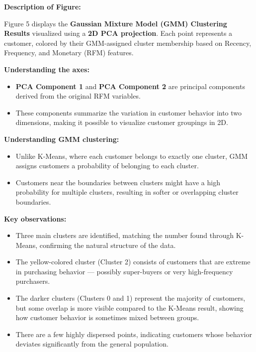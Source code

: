 \documentclass[12pt]{article}
\begin{document}
\noindent
\textbf{Description of Figure:} \\

\vspace{0.2cm}

Figure 5 displays the \textbf{Gaussian Mixture Model (GMM) Clustering Results} visualized using a \textbf{2D PCA projection}.  
Each point represents a customer, colored by their GMM-assigned cluster membership based on Recency, Frequency, and Monetary (RFM) features.

\vspace{0.4cm}

\textbf{Understanding the axes:}
\begin{itemize}
    \item \textbf{PCA Component 1} and \textbf{PCA Component 2} are principal components derived from the original RFM variables.
    \item These components summarize the variation in customer behavior into two dimensions, making it possible to visualize customer groupings in 2D.
\end{itemize}

\vspace{0.4cm}

\textbf{Understanding GMM clustering:}
\begin{itemize}
    \item Unlike K-Means, where each customer belongs to exactly one cluster, GMM assigns customers a probability of belonging to each cluster.
    \item Customers near the boundaries between clusters might have a high probability for multiple clusters, resulting in softer or overlapping cluster boundaries.
\end{itemize}

\vspace{0.4cm}

\textbf{Key observations:}
\begin{itemize}
    \item Three main clusters are identified, matching the number found through K-Means, confirming the natural structure of the data.
    \item The yellow-colored cluster (Cluster 2) consists of customers that are extreme in purchasing behavior — possibly super-buyers or very high-frequency purchasers.
    \item The darker clusters (Clusters 0 and 1) represent the majority of customers, but some overlap is more visible compared to the K-Means result, showing how customer behavior is sometimes mixed between groups.
    \item There are a few highly dispersed points, indicating customers whose behavior deviates significantly from the general population.
\end{itemize}
\end{document}
